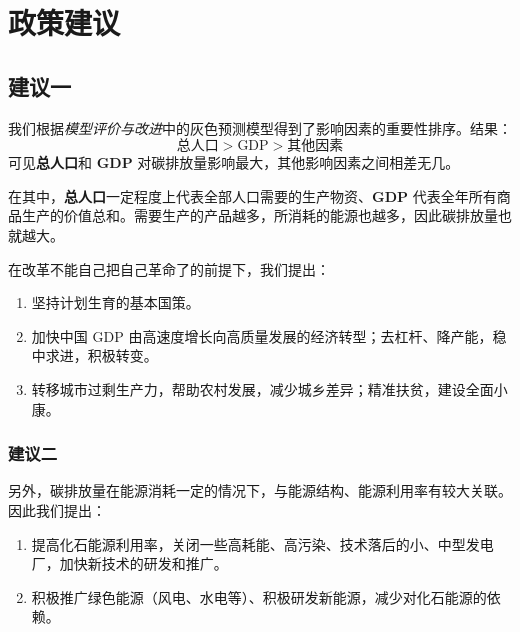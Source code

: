 \section{政策建议}
  \label{sec:zhencejianyi}

  \subsection{建议一}
    我们根据\emph{模型评价与改进}中的灰色预测模型得到了影响因素的重要性排序。结果：
    \[
      \text{总人口}>\textrm{GDP}>\text{其他因素}
    \]
    可见\textbf{总人口}和 \textbf{GDP} 对碳排放量影响最大，其他影响因素之间相差无几。
    
    在其中，\textbf{总人口}一定程度上代表全部人口需要的生产物资、\textbf{GDP} 代表全年所有商品生产的价值总和。需要生产的产品越多，所消耗的能源也越多，因此碳排放量也就越大。
    
    在改革不能自己把自己革命了的前提下，我们提出：
    \begin{enumerate}
      \item 坚持计划生育的基本国策。
      \item 加快中国 $\mathrm{GDP}$ 由高速度增长向高质量发展的经济转型；去杠杆、降产能，稳中求进，积极转变。
      \item 转移城市过剩生产力，帮助农村发展，减少城乡差异；精准扶贫，建设全面小康。
    \end{enumerate}

  \subsubsection{建议二}
    另外，碳排放量在能源消耗一定的情况下，与能源结构、能源利用率有较大关联。
    因此我们提出：
    \begin{enumerate}
      \item 提高化石能源利用率，关闭一些高耗能、高污染、技术落后的小、中型发电厂，加快新技术的研发和推广。
      \item 积极推广绿色能源（风电、水电等）、积极研发新能源，减少对化石能源的依赖。
    \end{enumerate}